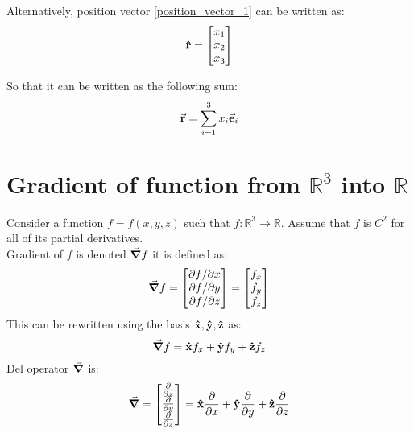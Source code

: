\documentclass[12pt]{article}
\begin{document}
\noindent
Alternatively, position vector \eqref{position_vector_1} can be written as:
\begin{equation*}
\vu{r} = \begin{bmatrix}
x_1 \\ x_2 \\ x_3
\end{bmatrix}
\end{equation*}

\noindent
So that it can be written as the following sum:
\begin{equation*}
\va{r} = \sum_{i = 1}^{3} x_i \va{e}_i
\end{equation*}


\section{Gradient of function from $\mathbb{R}^3$ into $\mathbb{R}$}
Consider a function $f=f(x,y,z)$ such that $f: \mathbb{R}^3 \rightarrow \mathbb{R}$. Assume that $f$ is $C^2$ for all of its partial derivatives.
\\ \indent Gradient of $f$ is denoted $\grad f$ it is defined as:
\begin{equation}
\grad f = \begin{bmatrix}
\partial f / \partial x \\
\partial f / \partial y \\
\partial f / \partial z \\
\end{bmatrix} = 
\begin{bmatrix}
f_x \\ f_y \\ f_z
\end{bmatrix}
\end{equation}
This can be rewritten using the basis ${\vu{x}, \vu{y}, \vu{z}}$ as:\begin{equation*}
\grad f = \vu{x} f_x + \vu{y} f_y + \vu{z} f_z
\end{equation*}
Del operator $\grad$ is:
\begin{equation}
\grad =
\begin{bmatrix}
\frac{\partial}{\partial x} \\
\frac{\partial}{\partial y} \\
\frac{\partial}{\partial z}
\end{bmatrix} = \vu{x} \frac{\partial}{\partial x} + 
\vu{y} \frac{\partial}{\partial y} + 
\vu{z} \frac{\partial}{\partial z}
\end{equation}
\end{document}
